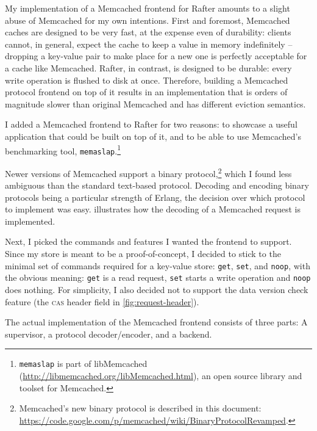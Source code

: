 \documentclass[12pt,chapterprefix=true,toc=bibliography,numbers=noendperiod,
               footnotes=multiple,twoside]{scrreprt}
\begin{document}
My implementation of a Memcached frontend for Rafter amounts to a slight abuse of Memcached for my own intentions. First and foremost, Memcached caches are designed to be very fast, at the expense even of durability: clients cannot, in general, expect the cache to keep a value in memory indefinitely -- dropping a key-value pair to make place for a new one is perfectly acceptable for a cache like Memcached. Rafter, in contrast, is designed to be durable: every write operation is flushed to disk at once. Therefore, building a Memcached protocol frontend on top of it results in an implementation that is orders of magnitude slower than original Memcached and has different eviction semantics.

I added a Memcached frontend to Rafter for two reasons: to showcase a useful application that could be built on top of it, and to be able to use Memcached's benchmarking tool, \texttt{memaslap}.\footnote{\texttt{memaslap} is part of libMemcached (\url{http://libmemcached.org/libMemcached.html}), an open source library and toolset for Memcached.}

Newer versions of Memcached support a binary protocol,\footnote{Memcached's new binary protocol is described in this document: \url{https://code.google.com/p/memcached/wiki/BinaryProtocolRevamped}.} which I found less ambiguous than the standard text-based protocol. Decoding and encoding binary protocols being a particular strength of Erlang, the decision over which protocol to implement was easy.  illustrates how the decoding of a Memcached request is implemented.

Next, I picked the commands and features I wanted the frontend to support. Since my store is meant to be a proof-of-concept, I decided to stick to the minimal set of commands required for a key-value store: \texttt{get}, \texttt{set}, and \texttt{noop}, with the obvious meaning: \texttt{get} is a read request, \texttt{set} starts a write operation and \texttt{noop} does nothing. For simplicity, I also decided not to support the data version check feature (the \textsc{cas} header field in \cref{fig:request-header}).


The actual implementation of the Memcached frontend consists of three parts: A supervisor, a protocol decoder/encoder, and a backend.
\end{document}
